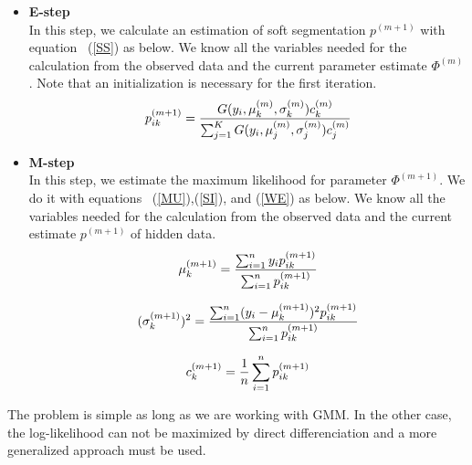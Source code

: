 \begin{itemize}

\item \textbf{E-step}\\
In this step, we calculate an estimation of soft segmentation $p^{(m+1)}$ with equation ~(\ref{SS}) as below. We know all the variables needed for the calculation from the observed data and the current parameter estimate $\Phi^{(m)}$. Note that an initialization is necessary for the first iteration.\\

  \begin{equation*}
  p_{ik}^{(m+1)}= \frac{G(y_i,\mu_k^{(m)},\sigma_k^{(m)})c_k^{(m)}}{\sum_{j=1}^K G(y_i,\mu_j^{(m)},\sigma_j^{(m)})c_j^{(m)}}\\
  \end{equation*}

\item \textbf{M-step}\\
In this step, we estimate the maximum likelihood for parameter $\Phi^{(m+1)}$. We do it with equations ~(\ref{MU}),(\ref{SI}), and (\ref{WE}) as below. We know all the variables needed for the calculation from the observed data and the current estimate $p^{(m+1)}$ of hidden data.\\

  \begin{equation*}
  \mu_k^{(m+1)} = \frac{\sum_{i=1}^n y_ip_{ik}^{(m+1)}}{\sum_{i=1}^n p_{ik}^{(m+1)}}\\
  \end{equation*}

  \begin{equation*}
  (\sigma_k^{(m+1)})^2 = \frac{\sum_{i=1}^n (y_i-\mu_k^{(m+1)})^2p_{ik}^{(m+1)}}{\sum_{i=1}^n p_{ik}^{(m+1)}}\\
  \end{equation*}
  
  \begin{equation*}
  c_k^{(m+1)} = \frac{1}{n}\sum_{i=1}^n p_{ik}^{(m+1)}\\
  \end{equation*}
\end{itemize}

The problem is simple as long as we are working with GMM. In the other case, the log-likelihood can not be maximized by direct differenciation and a more generalized approach must be used.
%

